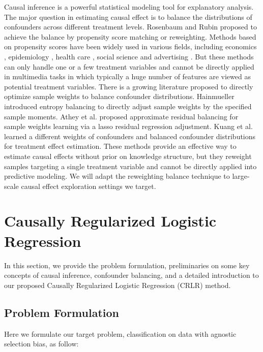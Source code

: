 \documentclass[sigconf]{acmart}
\begin{document}
Causal inference is a powerful statistical modeling tool for explanatory analysis.
The major question in estimating causal effect is to balance the distributions of confounders across different treatment levels.
Rosenbaum and Rubin \cite{rosenbaum1983central} proposed to achieve the balance by propensity score matching or reweighting.
Methods based on propensity scores have been widely used in various fields, including economics \cite{stuart2010matching}, epidemiology \cite{funk2011doubly}, health care \cite{dos2015using}, social science \cite{lechner1999earnings} and advertising \cite{sun2015causal}.
But these methods can only handle one or a few treatment variables and cannot be directly applied in multimedia tasks in which typically a huge number of features are viewed as potential treatment variables.
There is a growing literature proposed to directly optimize sample weights to balance confounder distributions.
Hainmueller \cite{hainmueller2011entropy} introduced entropy balancing to directly adjust sample weights by the specified sample moments.
Athey et al. \cite{athey2016approximate} proposed approximate residual balancing for sample weights learning via a lasso residual regression adjustment.
Kuang et al. \cite{Kuang2017Estimating} learned a different weights of confounders and balanced confounder distributions for treatment effect estimation.
These methods provide an effective way to estimate causal effects without prior on knowledge structure, but they reweight samples targeting a single treatment variable and cannot be directly applied into predictive modeling.
We will adapt the reweighting balance technique to large-scale causal effect exploration settings we target.

\section{Causally Regularized Logistic Regression}

In this section, we provide the problem formulation, preliminaries on some key concepts of causal inference, confounder balancing, and a detailed introduction to our proposed Causally Regularized Logistic Regression (CRLR) method.

\subsection{Problem Formulation}
Here we formulate our target problem, classification on data with agnostic selection bias, as follow:
\end{document}
